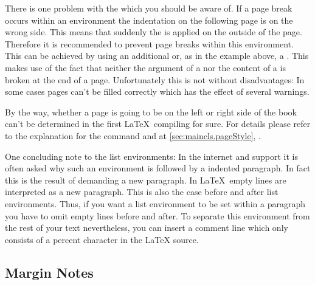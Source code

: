 There is one problem with the  which you
should be aware of. If a page break occurs within an
 environment the indentation on the following
page is on the wrong side.  This means that suddenly the  is applied on the outside of the page. Therefore it is
recommended to prevent page breaks within this environment. This can
be achieved by using an additional  or, as in the
example above, a . This makes use of the fact
that neither the argument of a  nor the content of a
 is broken at the end of a page.  Unfortunately
this is not without disadvantages: In some cases pages can't be filled
correctly which has the effect of several warnings.

By the way, whether a page is going to be on the left or right side of the
book can't be determined in the first \LaTeX\ compiling for sure.  For details
please refer to the explanation for the command  and
 at \autoref{sec:maincls.pageStyle},
.
%
%


\begin{Explain}
  One concluding note to the list environments: In the internet and
  support it is often asked why such an environment is followed by a
  indented paragraph. In fact this is the result of
  demanding a new paragraph. In \LaTeX\ empty lines are interpreted as
  a new paragraph. This is also the case before and after list
  environments. Thus, if you want a list environment to be set within
  a paragraph you have to omit empty lines before and after. To
  separate this environment from the rest of your text nevertheless,
  you can insert a comment line which only consists of a percent
  character in the {\LaTeX} source.
\end{Explain}

\subsection{Margin Notes}
\label{sec:maincls.marginNotes}

